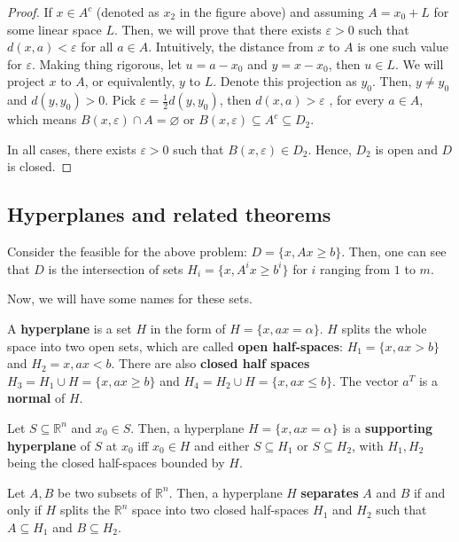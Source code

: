 \begin{proof}
  If \( x \in A^{c} \) (denoted as \( x_{2} \) in the figure above)
  and assuming \( A = x_{0} + L \) for some linear space \(
  L\). Then, we will prove that there exists \( \varepsilon > 0 \) such that \(
  d(x, a) < \varepsilon\) for all \( a \in A \). Intuitively, the distance from
  \( x \) to \( A \) is one such value for \( \varepsilon \).
  Making thing rigorous,
  let \( u = a - x_{0} \) and \( y = x - x_{0} \), then \( u \in L \). We will
  project \( x \) to \( A \), or equivalently, \( y \) to \( L \). Denote this
  projection as \( y_{0} \). Then, \( y \neq  y_{0} \) and \( d(y, y_{0}) > 0
  \). Pick \( \varepsilon = \frac{1}{2} d(y, y_{0}) \), then \( d(x, a) >
  \varepsilon \) , for every \( a \in A \), which means \( B(x, \varepsilon)
  \cap A = \varnothing \) or \( B(x, \varepsilon) \subseteq A^{c} \subseteq
  D_{2} \).

  In all cases, there exists \( \varepsilon > 0 \) such that \( B(x,
  \varepsilon) \in D_{2} \). Hence, \( D_{2} \) is open and \( D \) is closed.
\end{proof}



\subsection{Hyperplanes and related theorems} %
\label{sub:Hyperplanes and related theorems}

Consider the feasible for the above problem: \( D = \{x, Ax\ge b\}   \). Then,
one can see that \( D \) is the intersection of sets \( H_{i}=\{x, A^{i}x \ge
b^{i}\}   \) for \( i \) ranging from \( 1 \) to \( m \).

Now, we will have some names for these sets.

\begin{definition}
  A \textbf{hyperplane} is a set \( H \) in the form of \( H = \{x, ax =
  \alpha\}   \). \( H \) splits the whole space into two open sets, which are
  called \textbf{open half-spaces}: \( H_{1} = \{x, ax > b\}   \) and \( H_{2}
  = {x, ax < b} \). There are also \textbf{closed half spaces} \( H_{3} = H_{1}
  \cup H =
  \{x, ax \ge  b\}  \) and \( H_{4} = H_{2} \cup  H = \{x, ax \le  b\}   \). The
  vector \( a^{T} \) is a \textbf{normal} of \( H \).

  Let \( S \subseteq \mathbb{R}^{n} \) and \( x_{0} \in S \). Then, a hyperplane
  \( H = \{x, ax = \alpha\}   \) is a \textbf{supporting hyperplane} of \( S \)
  at \( x_{0} \) iff \( x_{0} \in H \) and either \( S \subseteq H_{1} \) or \(
  S \subseteq H_{2}\), with \( H_{1}, H_{2} \) being the closed half-spaces
  bounded by \( H \).

  Let \( A, B \) be two subsets of \( \mathbb{R}^{n} \). Then, a hyperplane \( H
  \) \textbf{separates} \( A \) and \( B \) if and only if \( H \) splits the \(
  \mathbb{R}^{n}\) space into two closed half-spaces \( H_{1} \) and \( H_{2} \)
  such that \( A \subseteq H_{1} \) and \( B \subseteq H_{2} \).
\end{definition}

